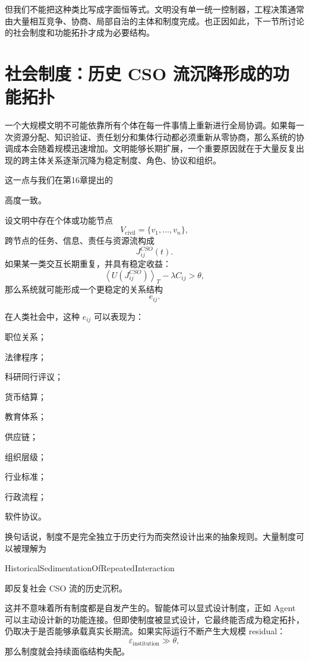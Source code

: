 但我们不能把这种类比写成字面恒等式。文明没有单一统一控制器，工程决策通常由大量相互竞争、协商、局部自治的主体和制度完成。也正因如此，下一节所讨论的社会制度和功能拓扑才成为必要结构。


\section{社会制度：历史 CSO 流沉降形成的功能拓扑}

一个大规模文明不可能依靠所有个体在每一件事情上重新进行全局协调。如果每一次资源分配、知识验证、责任划分和集体行动都必须重新从零协商，那么系统的协调成本会随着规模迅速增加。文明能够长期扩展，一个重要原因就在于大量反复出现的跨主体关系逐渐沉降为稳定制度、角色、协议和组织。

这一点与我们在第16章提出的
\begin{statementbox}
\centering
{}
\end{statementbox}
高度一致。

设文明中存在个体或功能节点
\[
V_{\mathrm{civil}}
=
\{v_1,\ldots,v_n\},
\]
跨节点的任务、信息、责任与资源流构成
\[
J_{ij}^{CSO}(t).
\]
如果某一类交互长期重复，并具有稳定收益：
\[
\left\langle
U(J_{ij}^{CSO})
\right\rangle_T
-
\lambda C_{ij}
>
\theta,
\]
那么系统就可能形成一个更稳定的关系结构
\[
e_{ij}.
\]

在人类社会中，这种 $e_{ij}$ 可以表现为：

职位关系；

法律程序；

科研同行评议；

货币结算；

教育体系；

供应链；

组织层级；

行业标准；

行政流程；

软件协议。

换句话说，制度不是完全独立于历史行为而突然设计出来的抽象规则。大量制度可以被理解为
\begin{statementbox}
HistoricalSedimentationOfRepeatedInteraction
\end{statementbox}
即反复社会 CSO 流的历史沉积。

这并不意味着所有制度都是自发产生的。智能体可以显式设计制度，正如 Agent 可以主动设计新的功能连接。但即使制度被显式设计，它最终能否成为稳定拓扑，仍取决于是否能够承载真实长期流。如果实际运行不断产生大规模 residual：
\[
\varepsilon_{\mathrm{institution}}\gg\theta,
\]
那么制度就会持续面临结构失配。

